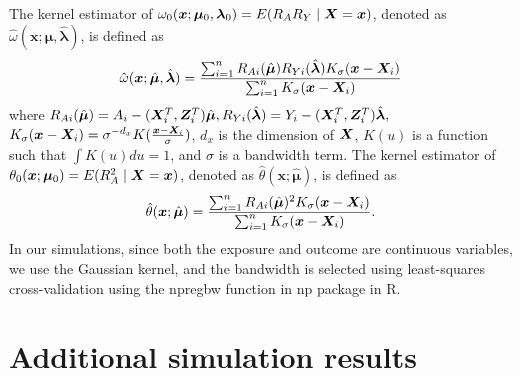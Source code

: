 \documentclass[12pt]{article}
\begin{document}
{The kernel estimator of $  \omega_0(\bm x; \bm\mu_0, {\bm\lambda_0}) = E(R_A R_Y\mid \bm{X} = \bm x)$, denoted as $ \hat \omega(\bm x; \hat{\bm\mu}, \hat{\bm\lambda})$, is defined as 
\begin{align*}
    \hat \omega(\bm x; \hat{\bm\mu}, \hat{\bm\lambda})= \frac{\sum_{i=1}^n R_{Ai} (\hat{\bm \mu}) R_{Yi}(\hat{\bm \lambda})  K_\sigma (\bm x - \bm{X}_i) }{\sum_{i=1}^n K_\sigma (\bm x - \bm{X}_i) }
\end{align*}
where $R_{Ai} (\hat{\bm \mu}) = A_i - (\bm{X}_i^T, \bm{Z}_i^T)\hat{\bm \mu}, 
R_{Yi}(\hat{\bm \lambda}) = Y_i - (\bm{X}_i^T, \bm{Z}_i^T)\hat{\bm \lambda},$   
$K_\sigma (\bm x - \bm{X}_i ) = \sigma^{-d_x} K (\frac{\bm x - \bm{X}_i }{\sigma})$, $d_x$ is the dimension of $\bm{X}$, $K(u)$ is a function such that $\int K(u) du = 1$, and $\sigma$ is a bandwidth term. The kernel estimator of $  \theta_0(\bm x; \bm\mu_0) = E(R_A^2\mid \bm{X} = \bm x)$, denoted as $ \hat \theta(\bm x; \hat{\bm \mu})$, is defined as 
\begin{align*}
    \hat \theta(\bm x; \hat{\bm \mu}) = \frac{\sum_{i=1}^n R_{Ai} (\hat{\bm \mu})^2  K_\sigma (\bm x - \bm{X}_i) }{\sum_{i=1}^n K_\sigma (\bm x - \bm{X}_i) } .
\end{align*}
In our simulations, since both the exposure and outcome are continuous variables, we use the Gaussian kernel, and the bandwidth is selected using least-squares cross-validation using the \textsf{npregbw} function in \textsf{np} package in \textsf{R}. 










\section{Additional simulation results}

}
\end{document}
